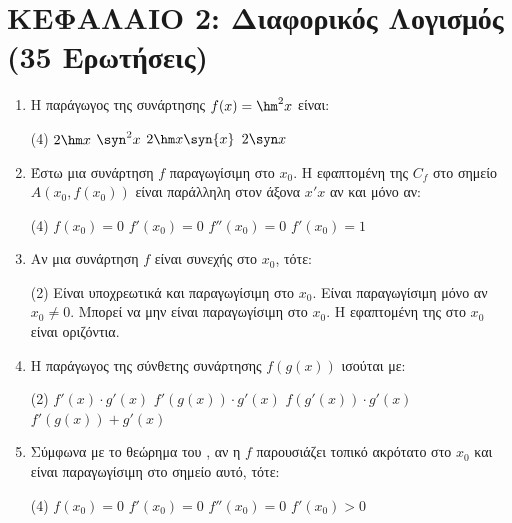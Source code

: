 \vspace{0.5cm}
\section*{ΚΕΦΑΛΑΙΟ 2: Διαφορικός Λογισμός (35 Ερωτήσεις)}

\begin{enumerate}[label=\textbf{2.\arabic*.}, itemsep=4mm]
    \item Η παράγωγος της συνάρτησης $f(x) = \hm^2 x$ είναι:
    \begin{tasks}[label=\let\textdexiakeraia\relax\alph*.](4)
        \task $2 \hm x$
        \task $\syn^2 x$
        \task $2\hm x\syn{x}$
        \task $2 \syn x$
    \end{tasks}

    \item Έστω μια συνάρτηση $f$ παραγωγίσιμη στο $x_0$. Η εφαπτομένη της $C_f$ στο σημείο $A(x_0, f(x_0))$ είναι παράλληλη στον άξονα $x'x$ αν και μόνο αν:
    \begin{tasks}[label=\let\textdexiakeraia\relax\alph*.](4)
        \task $f(x_0) = 0$
        \task $f'(x_0) = 0$
        \task $f''(x_0) = 0$
        \task $f'(x_0) = 1$
    \end{tasks}

    \item Αν μια συνάρτηση $f$ είναι συνεχής στο $x_0$, τότε:
    \begin{tasks}[label=\let\textdexiakeraia\relax\alph*.](2)
        \task Είναι υποχρεωτικά και παραγωγίσιμη στο $x_0$.
        \task Είναι παραγωγίσιμη μόνο αν $x_0 \neq 0$.
        \task Μπορεί να μην είναι παραγωγίσιμη στο $x_0$.
        \task Η εφαπτομένη της στο $x_0$ είναι οριζόντια.
    \end{tasks}

    \item Η παράγωγος της σύνθετης συνάρτησης $f(g(x))$ ισούται με:
    \begin{tasks}[label=\let\textdexiakeraia\relax\alph*.](2)
        \task $f'(x) \cdot g'(x)$
        \task $f'(g(x)) \cdot g'(x)$
        \task $f(g'(x)) \cdot g'(x)$
        \task $f'(g(x)) + g'(x)$
    \end{tasks}

    \item Σύμφωνα με το θεώρημα του , αν η $f$ παρουσιάζει τοπικό ακρότατο στο $x_0$ και είναι παραγωγίσιμη στο σημείο αυτό, τότε:
    \begin{tasks}[label=\let\textdexiakeraia\relax\alph*.](4)
        \task $f(x_0) = 0$
        \task $f'(x_0) = 0$
        \task $f''(x_0) = 0$
        \task $f'(x_0) > 0$
    \end{tasks}


\end{enumerate}
